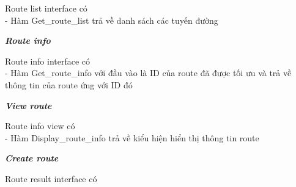 \documentclass[a4paper]{article}
\begin{document}
\begin{itemize}
\newpage
\begin{minipage}[b]{0.4\textwidth}
Route list interface có \\
- Hàm Get\_route\_list trả về danh sách các tuyến đường
\end{minipage}
\hfill
{}
\newline
\newline
\textbf{    \textit{Route info} } \\
\begin{minipage}[b]{0.4\textwidth}
Route info interface có \\
- Hàm Get\_route\_info với đầu vào là ID của route đã được tối ưu và trả về thông tin của route ứng với ID đó
\end{minipage}
\hfill
{}
\newline
\newline
\textbf{    \textit{View route} } \\
\begin{minipage}[b]{0.4\textwidth}
  Route info view  có \\
- Hàm Display\_route\_info trả về kiểu hiện hiển thị thông tin route
\end{minipage}
\hfill
{}
\newline
\newline
\textbf{    \textit{Create route} } \\
\begin{minipage}[b]{0.4\textwidth}
  Route result interface có \\

\end{minipage}
\end{itemize}
\end{document}

